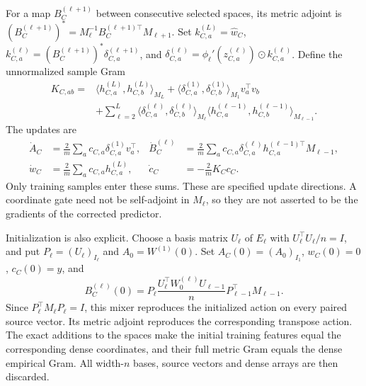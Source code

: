 For a map $B_C^{(\ell+1)}$ between consecutive selected spaces, its metric
adjoint is
$(B_C^{(\ell+1)})^*=M_\ell^{-1}B_C^{(\ell+1)\top}M_{\ell+1}$.
Set $k_{C,a}^{(L)}=\widehat w_C$,
$k_{C,a}^{(\ell)}=(B_C^{(\ell+1)})^*\delta_{C,a}^{(\ell+1)}$, and
$\delta_{C,a}^{(\ell)}=\phi_\ell'(z_{C,a}^{(\ell)})\odot k_{C,a}^{(\ell)}$.
Define the unnormalized sample Gram
\begin{equation}
 \begin{aligned}
 K_{C,ab}={}&\langle h_{C,a}^{(L)},h_{C,b}^{(L)}\rangle_{M_L}
 +\langle\delta_{C,a}^{(1)},\delta_{C,b}^{(1)}\rangle_{M_1}v_a^\top v_b\\
 &+\sum_{\ell=2}^L
 \langle\delta_{C,a}^{(\ell)},\delta_{C,b}^{(\ell)}\rangle_{M_\ell}
 \langle h_{C,a}^{(\ell-1)},h_{C,b}^{(\ell-1)}\rangle_{M_{\ell-1}}.
 \end{aligned}
 \label{eq:methods-selected-gram}
\end{equation}
The updates are
\begin{equation}
 \begin{aligned}
 \dot A_C&=\frac2m\sum_a c_{C,a}\delta_{C,a}^{(1)}v_a^\top,&
 \dot B_C^{(\ell)}&=\frac2m\sum_a c_{C,a}\delta_{C,a}^{(\ell)}
                h_{C,a}^{(\ell-1)\top}M_{\ell-1},\\
 \dot w_C&=\frac2m\sum_a c_{C,a}h_{C,a}^{(L)},&
 \dot c_C&=-\frac2mK_Cc_C.
 \end{aligned}
 \label{eq:methods-selected-flow}
\end{equation}
Only training samples enter these sums. These are specified update
directions. A coordinate gate need not be self-adjoint in $M_\ell$, so
they are not asserted to be the gradients of the corrected predictor.

Initialization is also explicit. Choose a basis matrix $U_\ell$ of
$E_\ell$ with $U_\ell^\top U_\ell/n=I$, and put
$P_\ell=(U_\ell)_{I_\ell}$ and $A_0=W^{(1)}(0)$.
Set $A_C(0)=(A_0)_{I_1}$,
$w_C(0)=0$, $c_C(0)=y$, and
\begin{equation}
 B_C^{(\ell)}(0)=P_\ell
 \frac{U_\ell^\top W_0^{(\ell)}U_{\ell-1}}n
 P_{\ell-1}^\top M_{\ell-1}.
 \label{eq:methods-selected-initialization}
\end{equation}
Since $P_\ell^\top M_\ell P_\ell=I$, this mixer reproduces the
initialized action on every paired source vector. Its metric adjoint
reproduces the corresponding transpose action. The exact additions to
the spaces make the initial training features equal the corresponding dense
coordinates, and their full metric Gram equals the dense empirical Gram.
All width-$n$ bases, source vectors
and dense arrays are then discarded.

